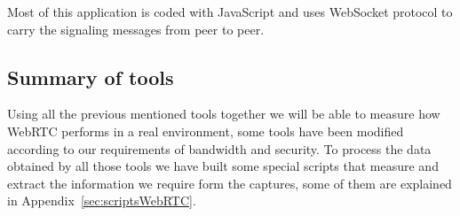 Most of this application is coded with JavaScript and uses WebSocket protocol to carry the signaling messages from peer to peer.

\subsection{Summary of tools}

Using all the previous mentioned tools together we will be able to measure how WebRTC performs in a real environment, some tools have been modified according to our requirements of bandwidth and security. To process the data obtained by all those tools we have built some special scripts that measure and extract the information we require form the captures, some of them are explained in Appendix~\ref{sec:scriptsWebRTC}.